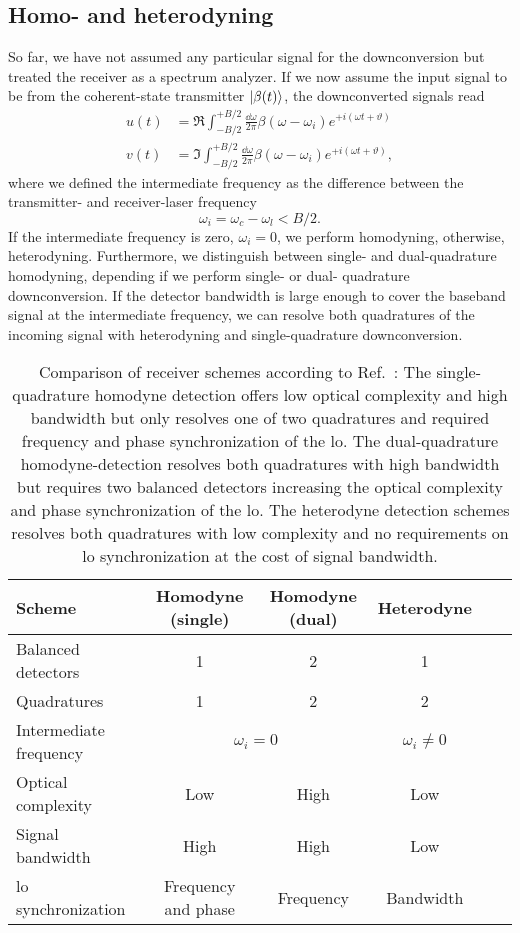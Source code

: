 \subsection{Homo- and heterodyning}

So far, we have not assumed any particular signal for the downconversion but treated the receiver as a spectrum analyzer.
If we now assume the input signal to be from the coherent-state transmitter $\lvert\beta(t)\rangle$, the downconverted signals read
\begin{align}
	u(t)
	&=
	\Re
	\int_{-B/2}^{+B/2}\frac{\dd{\omega}}{2\pi}
	\beta(\omega-\omega_i)
	e^{+i(\omega t+\vartheta)}
	\label{eq:receiver_demod_real}
	\\
	v(t)
	&=
	\Im
	\int_{-B/2}^{+B/2}\frac{\dd{\omega}}{2\pi}
	\beta(\omega-\omega_i)
	e^{+i(\omega t+\vartheta)}
	\label{eq:receiver_demod_imag}
	,
\end{align}
where we defined the intermediate frequency as the difference between the transmitter- and receiver-laser frequency
\begin{equation}
	\omega_i
	=
	\omega_c-\omega_l
	<
	B/2
	.
\end{equation}
If the intermediate frequency is zero, $\omega_i=0$, we perform homodyning, otherwise, heterodyning.
Furthermore, we distinguish between single- and dual-quadrature homodyning, depending if we perform single- or dual- quadrature downconversion.
If the detector bandwidth is large enough to cover the baseband signal at the intermediate frequency, we can resolve both quadratures of the incoming signal with heterodyning and single-quadrature downconversion.
\begin{table}[htb]
  \centering
  \begin{tabular}{lccccc}
    \toprule
    Scheme & Homodyne (single) & Homodyne (dual) & Heterodyne \\
    \midrule
    Balanced detectors & \num{1} & \num{2} & \num{1} \\
    Quadratures & \num{1} & \num{2} & \num{2} \\
    Intermediate frequency & \multicolumn{2}{c}{$\omega_i=0$} & $\omega_i\neq 0$ \\
    Optical complexity & Low & High & Low \\
    Signal bandwidth & High & High & Low \\
    \gls{lo} synchronization & Frequency and phase & Frequency & Bandwidth \\
    \bottomrule
  \end{tabular}
  \caption{Comparison of receiver schemes according to Ref.~\cite{Brunner2017}: The single-quadrature homodyne detection offers low optical complexity and high bandwidth but only resolves one of two quadratures and required frequency and phase synchronization of the \gls{lo}. The dual-quadrature homodyne-detection resolves both quadratures with high bandwidth but requires two balanced detectors increasing the optical complexity and phase synchronization of the \gls{lo}. The heterodyne detection schemes resolves both quadratures with low complexity and no requirements on \gls{lo} synchronization at the cost of signal bandwidth.}\label{tab:receivers}
\end{table}
